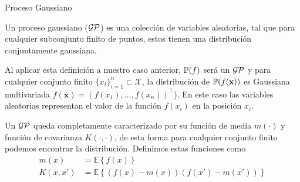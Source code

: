 \documentclass[handout, 9pt]{beamer}
\begin{document}
\begin{frame}{Proceso Gaussiano}

\begin{definition}
  Un proceso gaussiano ($\mathcal{GP}$) es una colección de variables aleatorias, tal que para cualquier subconjunto finito de puntos, estos tienen una distribución conjuntamente gaussiana.
\end{definition} \pause

Al aplicar esta definición a nuestro caso anterior, $\mathbb{P}(f)$ será un $\mathcal{GP}$ y para cualquier conjunto finito $\{ x_i\}_{i=1}^{n}  \subset \mathcal{X}$, la distribución de $\mathbb{P}(f(\mathbf{x}))$ es Gaussiana multivariada $f(\mathbf{x})=(f(x_1), \ldots, f(x_n))^\top$). En este caso las variables aleatorias representan el valor de la función $f(x_i)$ en la posición $x_i$. \pause
\vspace{0.2cm}

Un $\mathcal{GP}$ queda completamente caracterizado por su función de media $m(\cdot)$ y función de covarianza $K(\cdot, \cdot)$, de esta forma para cualquier conjunto finito podemos encontrar la distribución. Definimos estas funciones como
\begin{align*}
  m(x) & = \mathbb{E}\left\{f(x)\right\}\\
  K(x, x') & = \mathbb{E}\left\{\left(f(x) - m(x)\right) \left(f(x') - m(x') \right)\right\}
\end{align*}


\end{frame}
\end{document}
